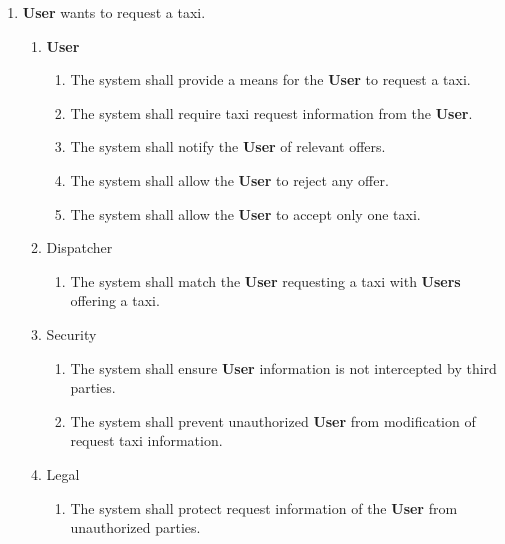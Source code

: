 \documentclass[english]{article}
\begin{document}
\begin{enumerate}[{BE}1.]
		\item \textbf{User} wants to request a taxi. 	
	\begin{enumerate}[{VP5}.1]
		\item \textbf{User}
			\begin{enumerate}
				\item The system shall provide a means for the \textbf{User} to request a taxi. 
				\item The system shall require taxi request information from the \textbf{User}.
				\item The system shall notify the \textbf{User} of relevant offers. 
				\item The system shall allow the \textbf{User} to reject any offer. 
				\item The system shall allow the \textbf{User} to accept only one taxi. 
			\end{enumerate}
		\item Dispatcher
			\begin{enumerate}
				\item The system shall match the \textbf{User} requesting a taxi with \textbf{Users} offering a taxi.
			\end{enumerate}
		\item Security
			\begin{enumerate}
				\item The system shall ensure \textbf{User} information is not intercepted by third parties.
				\item The system shall prevent unauthorized \textbf{User} from modification of request taxi information. 
			\end{enumerate}
		\item Legal
			\begin{enumerate}
				\item The system shall protect request information of the \textbf{User} from unauthorized parties.
			\end{enumerate}
	\end{enumerate}
	

\end{enumerate}
\end{document}
